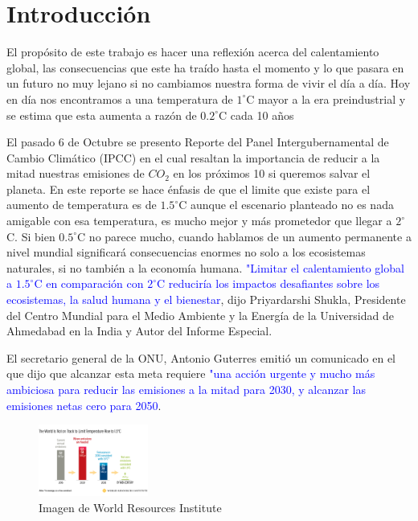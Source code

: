 \section{Introducción}
El propósito de este trabajo es hacer una reflexión acerca del calentamiento global, las consecuencias que este ha traído hasta el momento y lo que pasara en un futuro no muy lejano si no cambiamos nuestra forma de vivir el día a día. Hoy en día nos encontramos a una temperatura de $1^\circ$C mayor a la era preindustrial y se estima que esta aumenta a razón de $0.2^\circ$C cada 10 años

El pasado 6 de Octubre se presento Reporte del Panel Intergubernamental de Cambio Climático (IPCC) en el cual resaltan la importancia de reducir a la mitad nuestras emisiones de $CO_2$ en los próximos 10 si queremos salvar el planeta. En este reporte se hace énfasis de que el limite que existe para el aumento de temperatura es de $1.5^\circ$C aunque el escenario planteado no es nada amigable con esa temperatura, es mucho mejor y más prometedor que llegar a $2^\circ$C. Si bien $0.5^\circ$C no parece mucho, cuando hablamos de un aumento permanente a nivel mundial significará consecuencias enormes no solo a los ecosistemas naturales, si no también a la economía humana. \textcolor{blue}{"Limitar el calentamiento global a $1.5^\circ$C en comparación con $2^\circ$C reduciría los impactos desafiantes sobre los ecosistemas, la salud humana y el bienestar}, dijo Priyardarshi Shukla, Presidente del Centro Mundial para el Medio Ambiente y la Energía de la Universidad de Ahmedabad en la India y Autor del Informe Especial.

El secretario general de la ONU, Antonio Guterres emitió un comunicado en el que dijo que alcanzar esta meta requiere \textcolor{blue}{"una acción urgente y mucho más ambiciosa para reducir las emisiones a la mitad para 2030, y alcanzar las emisiones netas cero para 2050}.

\begin{figure}[H]
  \centering 
  \includegraphics[width=0.32\textwidth]{figuras/grafica.png}
  \caption{Imagen de World Resources Institute}
  \label{fig:revista_inatel}
\end{figure}




